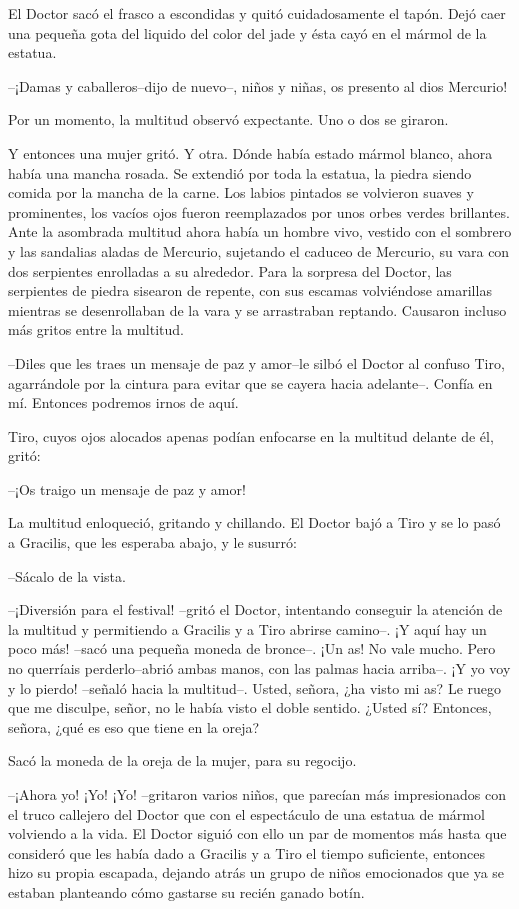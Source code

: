 El Doctor sacó el frasco a escondidas y quitó cuidadosamente el tapón.
Dejó caer una pequeña gota del liquido del color del jade y ésta cayó en
el mármol de la estatua.

--¡Damas y caballeros--dijo de nuevo--, niños y niñas, os presento al
dios Mercurio!

Por un momento, la multitud observó expectante. Uno o dos se giraron.

Y entonces una mujer gritó. Y otra. Dónde había estado mármol blanco,
ahora había una mancha rosada. Se extendió por toda la estatua, la
piedra siendo comida por la mancha de la carne. Los labios pintados se
volvieron suaves y prominentes, los vacíos ojos fueron reemplazados por
unos orbes verdes brillantes. Ante la asombrada multitud ahora había un
hombre vivo, vestido con el sombrero y las sandalias aladas de Mercurio,
sujetando el caduceo de Mercurio, su vara con dos serpientes enrolladas
a su alrededor. Para la sorpresa del Doctor, las serpientes de piedra
sisearon de repente, con sus escamas volviéndose amarillas mientras se
desenrollaban de la vara y se arrastraban reptando. Causaron incluso más
gritos entre la multitud.

--Diles que les traes un mensaje de paz y amor--le silbó el Doctor al
confuso Tiro, agarrándole por la cintura para evitar que se cayera hacia
adelante--. Confía en mí. Entonces podremos irnos de aquí.

Tiro, cuyos ojos alocados apenas podían enfocarse en la multitud delante
de él, gritó:

--¡Os traigo un mensaje de paz y amor!

La multitud enloqueció, gritando y chillando. El Doctor bajó a Tiro y se
lo pasó a Gracilis, que les esperaba abajo, y le susurró:

--Sácalo de la vista.

--¡Diversión para el festival! --gritó el Doctor, intentando conseguir
la atención de la multitud y permitiendo a Gracilis y a Tiro abrirse
camino--. ¡Y aquí hay un poco más! --sacó una pequeña moneda de
bronce--. ¡Un as! No vale mucho. Pero no querríais perderlo--abrió ambas
manos, con las palmas hacia arriba--. ¡Y yo voy y lo pierdo! --señaló
hacia la multitud--. Usted, señora, ¿ha visto mi as? Le ruego que me
disculpe, señor, no le había visto el doble sentido. ¿Usted sí?
Entonces, señora, ¿qué es eso que tiene en la oreja?

Sacó la moneda de la oreja de la mujer, para su regocijo.

--¡Ahora yo! ¡Yo! ¡Yo! --gritaron varios niños, que parecían más
impresionados con el truco callejero del Doctor que con el espectáculo
de una estatua de mármol volviendo a la vida. El Doctor siguió con ello
un par de momentos más hasta que consideró que les había dado a Gracilis
y a Tiro el tiempo suficiente, entonces hizo su propia escapada, dejando
atrás un grupo de niños emocionados que ya se estaban planteando cómo
gastarse su recién ganado botín.

